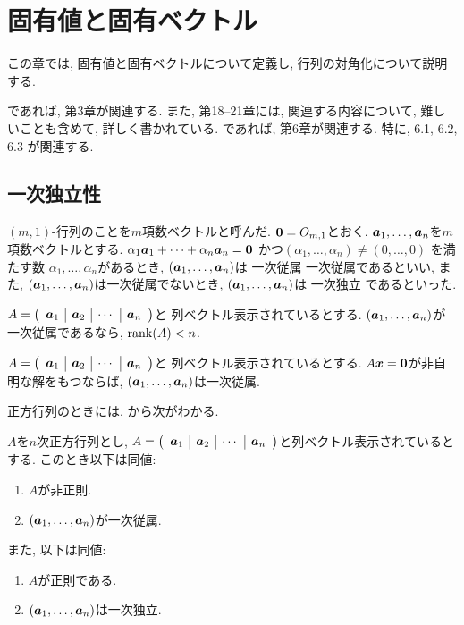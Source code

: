 \chapter{固有値と固有ベクトル}
\label{chap:eigen}

この章では, 固有値と固有ベクトルについて定義し,
行列の対角化について説明する.

\cite{978-4-7806-0772-7}であれば,
第3章が関連する.
また, 第18--21章には,
関連する内容について, 難しいことも含めて, 詳しく書かれている.
\cite{978-4-7806-0164-0}であれば,
第6章が関連する.
特に, 6.1, 6.2, 6.3 が関連する.

\section{一次独立性}

$(m,1)$-行列のことを$m$項数ベクトルと呼んだ.
$\boldsymbol{0}=O_{m,1}$とおく.
$\boldsymbol{a}_1,\ldots,\boldsymbol{a}_n$を$m$項数ベクトルとする.
$\alpha_1\boldsymbol{a}_1+\cdots+\alpha_n\boldsymbol{a}_n=\boldsymbol{0}$
かつ$(\alpha_1,\ldots,\alpha_n)\neq (0,\ldots,0)$
を満たす数
$\alpha_1,\ldots,\alpha_n$があるとき,
$(\boldsymbol{a}_1,\ldots,\boldsymbol{a}_n)$は
一次従属
一次従属であるといい,
また,
$(\boldsymbol{a}_1,\ldots,\boldsymbol{a}_n)$は一次従属でないとき,
$(\boldsymbol{a}_1,\ldots,\boldsymbol{a}_n)$は
一次独立
であるといった.



\begin{lemma}
  \label{lem:lindep:lessrank}
  $A=\left(\begin{array}{c|c|c|c}\boldsymbol{a}_1&\boldsymbol{a}_2&\cdots&\boldsymbol{a}_n\end{array}\right)$と
    列ベクトル表示されているとする.
    $(\boldsymbol{a}_1,\ldots,\boldsymbol{a}_n)$が一次従属であるなら,
    $\operatorname{rank}(A)<n$.
\end{lemma}
\begin{lemma}
  \label{lem:lineq:lessrank}
  $A=\left(\begin{array}{c|c|c|c}\boldsymbol{a}_1&\boldsymbol{a}_2&\cdots&\boldsymbol{a}_n\end{array}\right)$と
    列ベクトル表示されているとする.
    $A\boldsymbol{x}=\boldsymbol{0}$が非自明な解をもつならば,
    $(\boldsymbol{a}_1,\ldots,\boldsymbol{a}_n)$は一次従属.
\end{lemma}
正方行列のときには,
  から次がわかる.
\begin{prop}
  $A$を$n$次正方行列とし,
  $A=\left(\begin{array}{c|c|c|c}\boldsymbol{a}_1&\boldsymbol{a}_2&\cdots&\boldsymbol{a}_n\end{array}\right)$と列ベクトル表示されているとする.
  このとき以下は同値:
  \begin{enumerate}
  \item $A$が非正則.
  \item $(\boldsymbol{a}_1,\ldots,\boldsymbol{a}_n)$が一次従属.
  \end{enumerate}
  また, 以下は同値:
  \begin{enumerate}
  \item $A$が正則である.
  \item $(\boldsymbol{a}_1,\ldots,\boldsymbol{a}_n)$は一次独立.
  \end{enumerate}
\end{prop}

